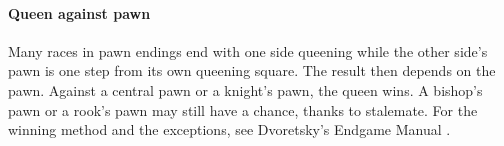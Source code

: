 
\paragraph{Queen against pawn}\label{queen-against-pawn}
Many races in pawn endings end with one side queening while the other side's pawn is one step
from its own queening square. The result then depends on the pawn. Against a central pawn or a
knight's pawn, the queen wins. A bishop's pawn or a rook's pawn may still have a chance, thanks
to stalemate. For the winning method and the exceptions, see Dvoretsky's Endgame Manual
\cite{Dvoretsky:2008-endgame-manual}.
